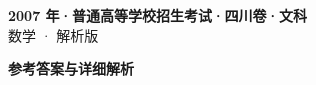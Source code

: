 \documentclass[zihao=-4, a4paper]{ctexart}
\begin{document}
\begin{center}
  {\Large\bfseries 2007 年·普通高等学校招生考试·四川卷·文科}\\[4pt]
  {\large 数学 · 解析版}
\end{center}
\medskip
{}

\clearpage
{}
\begin{center}{\Large\bfseries 参考答案与详细解析}\end{center}
\medskip

\end{document}
